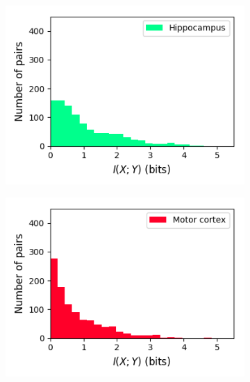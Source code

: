\documentclass[a4paper,12pt]{article}
\theoremstyle{definition}
\begin{document}
\begin{figure}[p]
  \begin{subfigure}{0.5\textwidth}
    \centering
    \includegraphics[width=\textwidth]{figures/all_hippocampus_6_1p0_information_histogram.png}
  \end{subfigure}
  \begin{subfigure}{0.5\textwidth}
    \centering
    \includegraphics[width=\textwidth]{figures/all_motor_cortex_10_1p0_information_histogram.png}
  \end{subfigure}
  \begin{subfigure}{0.5\textwidth}
    \centering

\end{subfigure}
\end{figure}
\end{document}
